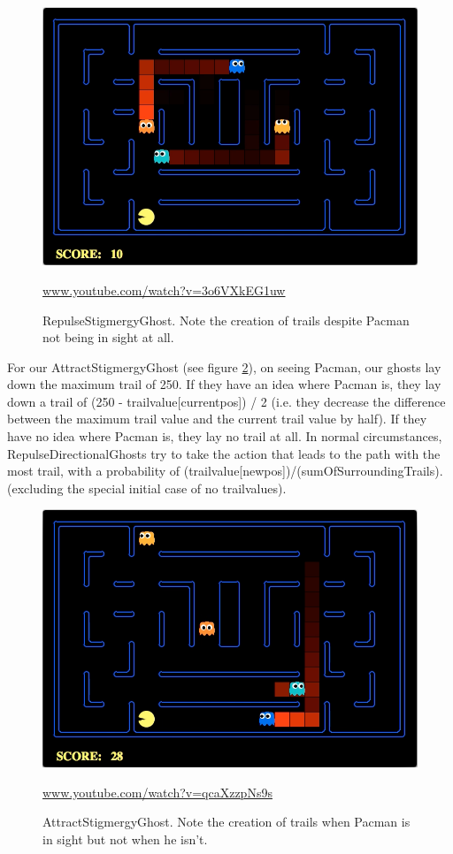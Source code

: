 \documentclass[11pt]{article}
\begin{document}
\begin{multicols}{2}
\begin{figure}[H]
	\includegraphics[width=\columnwidth]{RepulseGhost.png}
	\caption{RepulseStigmergyGhost. Note the creation of trails despite Pacman not being in sight at all.}
	\protect\url{www.youtube.com/watch?v=3o6VXkEG1uw} 
	\label{fig:repulseghost}
\end{figure}

For our AttractStigmergyGhost (see figure \ref{fig:attractghost}), on seeing Pacman, our ghosts lay down the maximum trail of 250.  If they have an idea where Pacman is, they lay down a trail of (250 - trailvalue[currentpos]) / 2 (i.e. they decrease the difference between the maximum trail value and the current trail value by half).   If they have no idea where Pacman is, they lay no trail at all. In normal circumstances, RepulseDirectionalGhosts try to take the action that leads to the path with the most trail, with a probability of (trailvalue[newpos])/(sumOfSurroundingTrails). (excluding the special initial case of no trailvalues).  

\begin{figure}[H]
	\includegraphics[width=\columnwidth]{AttractGhost.png}
	\caption{AttractStigmergyGhost. Note the creation of trails when Pacman is in sight but not when he isn't.}
	\protect\url{www.youtube.com/watch?v=qcaXzzpNs9s} 
	\label{fig:attractghost}
\end{figure}


\end{multicols}
\end{document}

